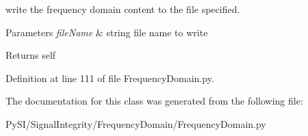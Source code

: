 write the frequency domain content to the file specified. 


\begin{DoxyParams}{Parameters}
{\em file\+Name} & string file name to write \\
\hline
\end{DoxyParams}
\begin{DoxyReturn}{Returns}
self 
\end{DoxyReturn}


Definition at line 111 of file Frequency\+Domain.\+py.



The documentation for this class was generated from the following file\+:\begin{DoxyCompactItemize}
\item 
Py\+S\+I/\+Signal\+Integrity/\+Frequency\+Domain/Frequency\+Domain.\+py\end{DoxyCompactItemize}
